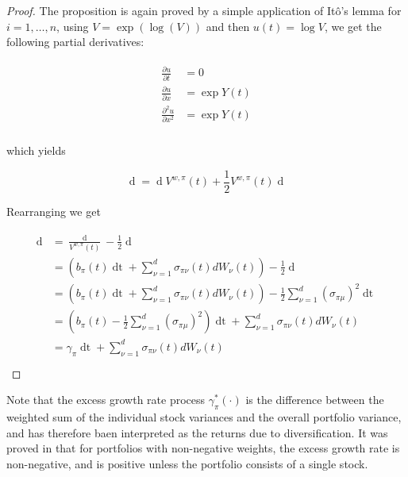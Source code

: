 \documentclass[british]{amsart} \usepackage{lmodern}
\numberwithin{equation}{section} \numberwithin{figure}{section}
\theoremstyle{plain} \newtheorem{thm}{\protect\theoremname}[section]
\theoremstyle{definition} \newtheorem{defn}[thm]{\protect\definitionname}
\theoremstyle{plain} \newtheorem{assumption}[thm]{\protect\assumptionname}
\theoremstyle{plain} \newtheorem{lem}[thm]{\protect\lemmaname}
\theoremstyle{plain} \newtheorem{prop}[thm]{\protect\propositionname}
\theoremstyle{remark} \newtheorem{rem}[thm]{\protect\remarkname}
\theoremstyle{plain} \newtheorem{cor}[thm]{\protect\corollaryname}
\renewcommand{\d}[1]{\mathop{\mathrm{d}{#1}}}
\newcommand{\rangei}{i=1,\dots,n} \newcommand{\measure}{\mathbb{P}}
\newcommand{\V}{V^{w,\pi}}
\begin{document}
\begin{proof}

  The proposition is again proved by a simple application of It\^{o}'s lemma 
  for $\rangei$, using $V = \exp(\log(V))$ and then $u(t) = \log{V}$, we get 
  the following partial derivatives:

  \begin{gather*}
    \begin{split}
      \frac{\partial u}{\partial t} &= 0 \\
      \frac{\partial u}{\partial x} &= \exp{Y(t)}  \\
      \frac{\partial^2 u}{\partial x^2} &= \exp{Y(t)}  \\
    \end{split}
  \end{gather*}

  which yields

  \begin{equation*}
      \d{\V(t)} = \d{\log{\V(t)}} \V(t) 
          + \frac{1}{2} \V(t) \d{ \langle \log{\V} \rangle_{t} } 
  \end{equation*}

  Rearranging we get

  \begin{gather*}
    \begin{split}
      \d{\log{\V(t)}} 
      &= \frac{\d{\V(t)}}{\V(t)} 
          - \frac{1}{2} \d{ \langle \log{\V} \rangle_{t} } \\
      &= \left(
          b_{\pi}(t)\d{t} + 
              \sum_{\nu=1}^{d} \sigma_{\pi\nu}(t) dW_{\nu}(t)
          \right)
          - \frac{1}{2} \d{ \langle \log{\V} \rangle_{t} } \\
      &= \left(
          b_{\pi}(t)\d{t} + 
              \sum_{\nu=1}^{d} \sigma_{\pi\nu}(t) dW_{\nu}(t)
          \right)
          - \frac{1}{2} \sum_{\nu=1}^{d}(\sigma_{\pi\mu})^2\d{t} \\
      &= \left(
              b_{\pi}(t)
              - \frac{1}{2} \sum_{\nu=1}^{d}(\sigma_{\pi\mu})^2 
          \right) \d{t} +
          \sum_{\nu=1}^{d} \sigma_{\pi\nu}(t) dW_{\nu}(t) \\
      &= \gamma_{\pi}\d{t} + \sum_{\nu=1}^{d} \sigma_{\pi\nu}(t) dW_{\nu}(t) \\
    \end{split}
  \end{gather*}

\end{proof}

Note that the excess growth rate process $\gamma_{\pi}^{*}(\cdot)$ is the
difference between the weighted sum of the individual stock variances and the
overall portfolio variance, and has therefore baen interpreted as the returns due
to diversification. It was proved in \cite{fernholz1999diversity} that for
portfolios with non-negative weights, the excess growth rate is non-negative,
and is positive unless the portfolio consists of a single stock.
\end{document}
